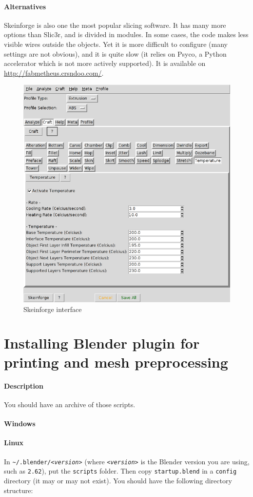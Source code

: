 \documentclass{article}
\begin{document}
	\paragraph{Alternatives} Skeinforge is also one the most popular slicing software. It has many more options than Slic3r, and is divided in modules. In some cases, the code makes less visible wires outside the objects. Yet it is more difficult to configure (many settings are not obvious), and it is quite slow (it relies on Psyco, a Python accelerator which is not more actively supported). It is available on \url{http://fabmetheus.crsndoo.com/}.

	\begin{figure}[h!]
		\centering
		\includegraphics[width=0.6\linewidth]{skeinforge.png}
		\caption{Skeinforge interface}
	\end{figure}

\newpage

\section{Installing Blender plugin for printing and mesh preprocessing}

	\paragraph{Description} You should have an archive of those scripts.

	\paragraph{Windows} %

	\paragraph{Linux} In \texttt{\~ {}/.blender/\emph{<version>}} (where \texttt{\emph{<version>}} is the Blender version you are using, such as \texttt{2.62}), put the \texttt{scripts} folder. Then copy \texttt{startup.blend} in a \texttt{config} directory (it may or may not exist). You should have the following directory structure:\\
\end{document}
